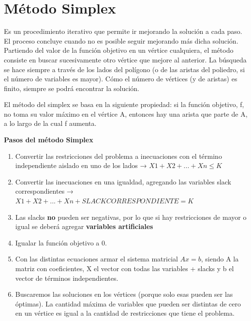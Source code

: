\documentclass[titlepage,a4paper]{article}
\begin{document}









\section{Método Simplex}

Es un procedimiento iterativo que permite ir mejorando la solución a cada paso. El proceso concluye cuando no es posible seguir mejorando más dicha solución.
Partiendo del valor de la función objetivo en un vértice cualquiera, el método consiste en buscar sucesivamente otro vértice que mejore al anterior. La búsqueda se hace siempre a través de los lados del polígono (o de las aristas del poliedro, si el número de variables es mayor). Cómo el número de vértices (y de aristas) es finito, siempre se podrá encontrar la solución.

El método del simplex se basa en la siguiente propiedad: si la función objetivo, f, no toma su valor máximo en el vértice A, entonces hay una arista que parte de A, a lo largo de la cual f aumenta.

\vspace{0.5cm}

\textbf{Pasos del método Simplex}


\begin{enumerate}
    \item Convertir las restricciones del problema a inecuaciones con el término independiente aislado en uno de los lados → $X1 + X2 + ... + Xn \leq K$
    \item Convertir las inecuaciones en una igualdad, agregando las variables slack correspondientes → $X1 + X2 + ... + Xn + SLACKCORRESPONDIENTE = K$
    \item Las slacks \textbf{no} pueden ser negativas, por lo que si hay restricciones de mayor o igual se deberá agregar \textbf{variables artificiales}
    \item Igualar la función objetivo a 0.
    \item Con las distintas ecuaciones armar el sistema matricial $Ax = b$, siendo A la matriz con coeficientes, X el vector con todas las variables + slacks y b el vector de términos independientes.
    \item Buscaremos las soluciones en los vértices (porque solo esas pueden ser las óptimas). La cantidad máxima de variables que pueden ser distintas de cero en un vértice es igual a la cantidad de restricciones que tiene el problema.
\end{enumerate}
\end{document}
